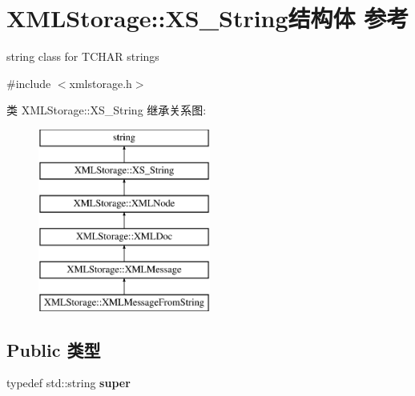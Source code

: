 \hypertarget{struct_x_m_l_storage_1_1_x_s___string}{}\section{X\+M\+L\+Storage\+:\+:X\+S\+\_\+\+String结构体 参考}
\label{struct_x_m_l_storage_1_1_x_s___string}


string class for T\+C\+H\+AR strings  




{\ttfamily \#include $<$xmlstorage.\+h$>$}

类 X\+M\+L\+Storage\+:\+:X\+S\+\_\+\+String 继承关系图\+:\begin{figure}[H]
\begin{center}
\leavevmode
\includegraphics[height=6.000000cm]{struct_x_m_l_storage_1_1_x_s___string}
\end{center}
\end{figure}
\subsection*{Public 类型}
\begin{DoxyCompactItemize}
\item 
\mbox{\label{struct_x_m_l_storage_1_1_x_s___string_a0ab7b33aa065893820604bb225d2886d}} 
typedef std\+::string {\bfseries super}
\end{DoxyCompactItemize}
